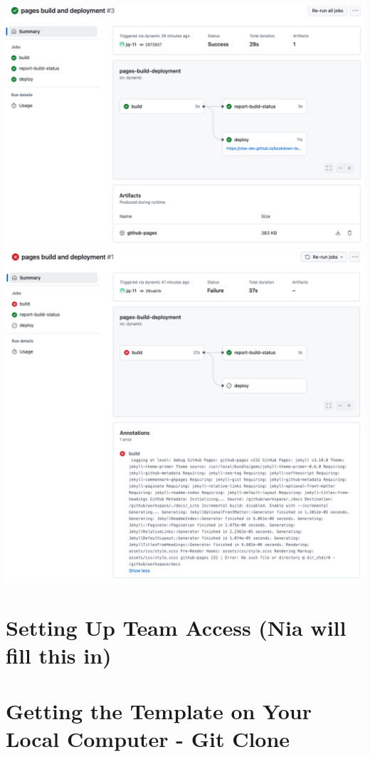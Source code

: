 \documentclass[
]{book}
\theoremstyle{definition}
\theoremstyle{definition}
\theoremstyle{definition}
\theoremstyle{definition}
\theoremstyle{remark}
\begin{document}
\includegraphics{img/git-instruct/successful-deploy.png}\\
\includegraphics{img/git-instruct/failed-deploy.png}\\

\section{Setting Up Team Access (Nia will fill this in)}\label{setting-up-team-access-nia-will-fill-this-in}

\section{Getting the Template on Your Local Computer - Git Clone}\label{getting-the-template-on-your-local-computer---git-clone}
\end{document}
